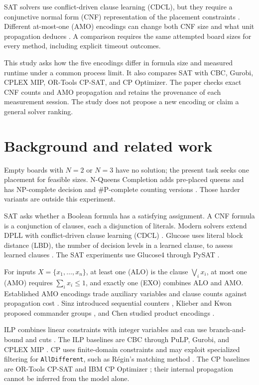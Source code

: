 \documentclass[a4paper,fleqn]{cas-sc}
\begin{document}
SAT solvers use conflict-driven clause learning (CDCL), but they require a conjunctive normal form (CNF) representation of the placement constraints \cite{marques2009cdcl}. Different at-most-one (AMO) encodings can change both CNF size and what unit propagation deduces \cite{prestwich2007cnf}. A comparison requires the same attempted board sizes for every method, including explicit timeout outcomes.

This study asks how the five encodings differ in formula size and measured runtime under a common process limit. It also compares SAT with CBC, Gurobi, CPLEX MIP, OR-Tools CP-SAT, and CP Optimizer. The paper checks exact CNF counts and AMO propagation and retains the provenance of each measurement session. The study does not propose a new encoding or claim a general solver ranking.

\section{Background and related work}
Empty boards with $N=2$ or $N=3$ have no solution; the present task seeks one placement for feasible sizes. N-Queens Completion adds pre-placed queens and has NP-complete decision and \#P-complete counting versions \cite{gent2017complexity}. Those harder variants are outside this experiment.

SAT asks whether a Boolean formula has a satisfying assignment. A CNF formula is a conjunction of clauses, each a disjunction of literals. Modern solvers extend DPLL with conflict-driven clause learning (CDCL) \cite{marques1999grasp,marques2009cdcl,moskewicz2001chaff}. Glucose uses literal block distance (LBD), the number of decision levels in a learned clause, to assess learned clauses \cite{audemard2009predicting,audemard2018glucose}. The SAT experiments use Glucose4 through PySAT \cite{ignatiev2018pysat}.

For inputs $X=\{x_1,\dots,x_n\}$, at least one (ALO) is the clause $\bigvee_i x_i$, at most one (AMO) requires $\sum_i x_i\leq1$, and exactly one (EXO) combines ALO and AMO. Established AMO encodings trade auxiliary variables and clause counts against propagation cost \cite{frisch2005sat,prestwich2007cnf}. Sinz introduced sequential counters \cite{sinz2005towards}, Klieber and Kwon proposed commander groups \cite{klieber2007efficient}, and Chen studied product encodings \cite{chen2010new}.

ILP combines linear constraints with integer variables and can use branch-and-bound and cuts \cite{nemhauser1988integer}. The ILP baselines are CBC through PuLP, Gurobi, and CPLEX MIP \cite{mitchell1996lp,gurobi,cplex}. CP uses finite-domain constraints and may exploit specialized filtering for \texttt{AllDifferent}, such as R\'egin's matching method \cite{regin1994filtering,rossi2006handbook}. The CP baselines are OR-Tools CP-SAT and IBM CP Optimizer \cite{ortools,cplex}; their internal propagation cannot be inferred from the model alone.
\end{document}
